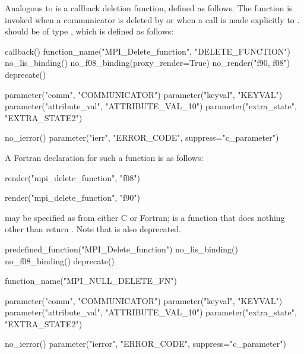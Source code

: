 
Analogous to  is a callback deletion function, defined
as follows.  The  function is invoked when a communicator is
deleted by  or when a call is made explicitly
to .   should be
of type , which is defined as follows:



\begin{mpi-binding}
    callback()
    function_name("MPI_Delete_function", "DELETE_FUNCTION")
    no_lis_binding()
    no_f08_binding(proxy_render=True)
    no_render("f90, f08")
    deprecate()
    
    parameter("comm", "COMMUNICATOR")
    parameter("keyval", "KEYVAL")
    parameter("attribute_val", "ATTRIBUTE_VAL_10")
    parameter("extra_state", "EXTRA_STATE2")
    
    no_ierror()
    parameter("ierr", "ERROR_CODE", suppress="c_parameter")
\end{mpi-binding}

A Fortran declaration for such a function is as follows:

\begin{mpi-binding}
    render("mpi_delete_function", "f08")
\end{mpi-binding}

%
\begin{mpi-binding}
    render("mpi_delete_function", "f90")
\end{mpi-binding}

 may be specified as
from either C or Fortran;
 is a function that does nothing other
than return .
Note that  is also deprecated.

\begin{mpi-binding}
    predefined_function("MPI_Delete_function")
    no_lis_binding()
    no_f08_binding()
    deprecate()
    
    function_name("MPI_NULL_DELETE_FN")
    
    parameter("comm", "COMMUNICATOR")
    parameter("keyval", "KEYVAL")
    parameter("attribute_val", "ATTRIBUTE_VAL_10")
    parameter("extra_state", "EXTRA_STATE2")
    
    no_ierror()
    parameter("ierror", "ERROR_CODE", suppress="c_parameter")
\end{mpi-binding}


